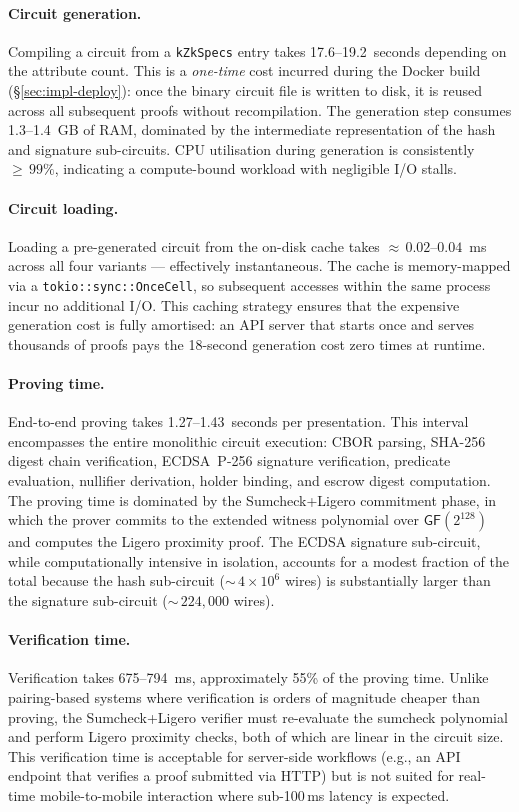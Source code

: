 \paragraph{Circuit generation.}
Compiling a circuit from a \texttt{kZkSpecs} entry takes 17.6--19.2~seconds depending on the attribute count.
This is a \emph{one-time} cost incurred during the Docker build (\S\ref{sec:impl-deploy}): once the binary circuit file is written to disk, it is reused across all subsequent proofs without recompilation.
The generation step consumes 1.3--1.4~GB of RAM, dominated by the intermediate representation of the hash and signature sub-circuits.
CPU utilisation during generation is consistently ${\geq}\,99\%$, indicating a compute-bound workload with negligible I/O stalls.

\paragraph{Circuit loading.}
Loading a pre-generated circuit from the on-disk cache takes ${\approx}\,0.02$--$0.04$~ms across all four variants --- effectively instantaneous.
The cache is memory-mapped via a \texttt{tokio::sync::OnceCell}, so subsequent accesses within the same process incur no additional I/O.
This caching strategy ensures that the expensive generation cost is fully amortised: an API server that starts once and serves thousands of proofs pays the 18-second generation cost zero times at runtime.

\paragraph{Proving time.}
End-to-end proving takes 1.27--1.43~seconds per presentation.
This interval encompasses the entire monolithic circuit execution: CBOR parsing, SHA-256 digest chain verification, ECDSA~P-256 signature verification, predicate evaluation, nullifier derivation, holder binding, and escrow digest computation.
The proving time is dominated by the Sumcheck+Ligero commitment phase, in which the prover commits to the extended witness polynomial over $\mathsf{GF}(2^{128})$ and computes the Ligero proximity proof.
The ECDSA signature sub-circuit, while computationally intensive in isolation, accounts for a modest fraction of the total because the hash sub-circuit (${\sim}\,4 \times 10^6$ wires) is substantially larger than the signature sub-circuit (${\sim}\,224{,}000$ wires).

\paragraph{Verification time.}
Verification takes 675--794~ms, approximately 55\% of the proving time.
Unlike pairing-based systems where verification is orders of magnitude cheaper than proving, the Sumcheck+Ligero verifier must re-evaluate the sumcheck polynomial and perform Ligero proximity checks, both of which are linear in the circuit size.
This verification time is acceptable for server-side workflows (e.g., an API endpoint that verifies a proof submitted via HTTP) but is not suited for real-time mobile-to-mobile interaction where sub-100\,ms latency is expected.

